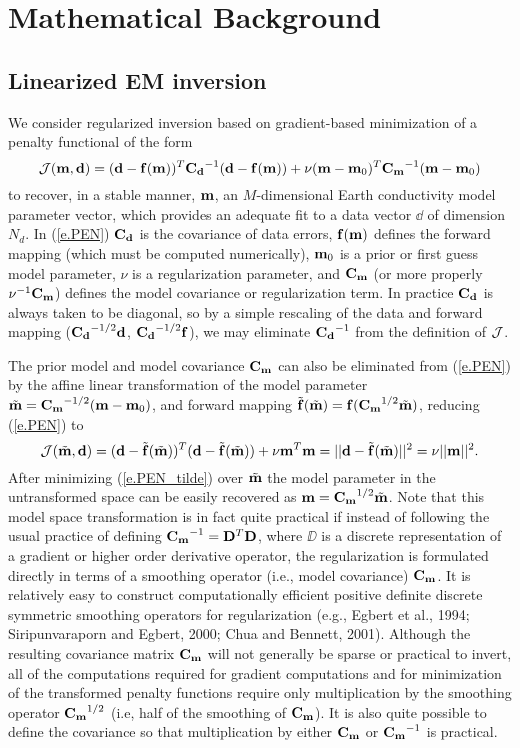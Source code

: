 \section{Mathematical Background}

\subsection{Linearized EM inversion}

We consider regularized inversion based on 
gradient-based minimization of a penalty functional of the form
\begin{equation}
\label{e.PEN}
{\cal J} ({\bf m} , {\bf d} ) =  ({\bf d}-{\bf f}( {\bf m} ) )^T {\bf C_d}^{-1} ({\bf d}-{\bf f}( {\bf m} ) ) + 
\nu ({\bf m} - {\bf m}_0 )^T {\bf C_m}^{-1} ({\bf m} - {\bf m}_0 ) 
\end{equation}
to recover, in a stable manner, 
${\bf m}$, an $M$-dimensional Earth conductivity model parameter vector,
which provides an adequate fit to a data vector
$\dd$ of dimension $N_d$. In (\ref{e.PEN}) ${\bf C_d}$ is the covariance
of data errors, ${\bf f} ({\bf m})$ defines the forward mapping (which must
be computed numerically),
${\bf m}_0$ is a prior or first guess model parameter, $\nu$ is
a regularization parameter, and ${\bf C_m}$ (or more properly
$\nu^{-1} {\bf C_m}$) defines the model covariance or regularization term.  
In practice ${\bf C_d}$ is always taken to be diagonal, so by a simple
rescaling of the data and forward mapping 
(${\bf C_d}^{-1/2} {\bf d}$, ${\bf C_d}^{-1/2} {\bf f}$),
we may eliminate ${\bf C_d}^{-1}$ from the definition of ${\cal J}$.

The prior model and model covariance ${\bf C_m}$
can also be eliminated from (\ref{e.PEN})
by the affine linear transformation of the model parameter
$\tilde {{\bf m}} = {\bf C_m}^{-1/2}({\bf m} - {\bf m}_0)$,
and forward mapping 
$\tilde{\bf f} (\tilde{\bf m} ) = {\bf f} ({\bf C_m}^{1/2}\tilde{\bf m} )$,
reducing (\ref{e.PEN}) to
\begin{equation}
\label{e.PEN_tilde}
{\cal J} (\tilde {{\bf m}} , {\bf d} ) =  ({\bf d}-\tilde{\bf f}( \tilde{\bf m} ) )^T ({\bf d}-\tilde{\bf f}( \tilde{\bf m} ) ) + 
\nu {\bf m}^T{\bf m}  = || {\bf d}-\tilde{\bf f}( \tilde{\bf m} ) ||^2 = \nu || {\bf m} ||^2   .
\end{equation}
After minimizing (\ref{e.PEN_tilde}) over $\tilde {{\bf m}}$ the 
model parameter in the untransformed space can be
easily recovered as ${\bf m} = {\bf C_m}^{1/2}\tilde {{\bf m}}$.  
Note that this model space transformation is in fact quite practical if
instead of following the usual practice of defining
${\bf C_m}^{-1} = {\bf D}^T{\bf D}$, where $\DD$ is a discrete representation of a gradient 
or higher order derivative operator,
the regularization is formulated directly in terms of a smoothing
operator (i.e., model covariance) ${\bf C_m}$.
It is relatively easy to construct computationally efficient positive
definite discrete
symmetric smoothing operators for regularization
(e.g., Egbert et al., 1994; Siripunvaraporn and Egbert, 2000; 
Chua and Bennett, 2001).
Although the resulting covariance
matrix ${\bf C_m}$ will not generally be sparse or practical
to invert, all of the computations required for
gradient computations and for minimization of
the transformed penalty functions require only multiplication by the smoothing
operator ${\bf C_m}^{1/2}$ (i.e, half of the smoothing of ${\bf C_m}$).
It is also  quite possible to define the covariance so that
multiplication by either ${\bf C_m}$ or ${\bf C_m}^{-1}$ is practical.

